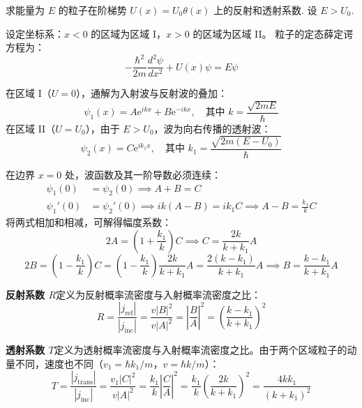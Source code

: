 \begin{exercise}\label{ex:24.5}
求能量为 $E$ 的粒子在阶梯势 $U(x) = U_0\theta(x)$ 上的反射和透射系数. 设 $E > U_0$.
\end{exercise}
\begin{solution}
设定坐标系：$x < 0$ 的区域为区域 I，$x > 0$ 的区域为区域 II。
粒子的定态薛定谔方程为：
$$ - \frac{\hbar^2}{2m} \frac{d^2\psi}{dx^2} + U(x)\psi = E\psi $$

在区域 I（$U = 0$），通解为入射波与反射波的叠加：
$$ \psi_1(x) = A \mathrm{e}^{ikx} + B \mathrm{e}^{-ikx}, \quad \text{其中 } k = \frac{\sqrt{2mE}}{\hbar} $$
在区域 II（$U = U_0$），由于 $E > U_0$，波为向右传播的透射波：
$$ \psi_2(x) = C \mathrm{e}^{ik_1 x}, \quad \text{其中 } k_1 = \frac{\sqrt{2m(E-U_0)}}{\hbar} $$

在边界 $x = 0$ 处，波函数及其一阶导数必须连续：
\begin{align*}
    \psi_1(0) &= \psi_2(0) \implies A + B = C \\
    \psi_1'(0) &= \psi_2'(0) \implies ik(A - B) = ik_1 C \implies A - B = \frac{k_1}{k} C
\end{align*}
将两式相加和相减，可解得幅度系数：
$$ 2A = \left(1 + \frac{k_1}{k}\right) C \implies C = \frac{2k}{k + k_1} A $$
$$ 2B = \left(1 - \frac{k_1}{k}\right) C = \left(1 - \frac{k_1}{k}\right) \frac{2k}{k + k_1} A = \frac{2(k - k_1)}{k + k_1} A \implies B = \frac{k - k_1}{k + k_1} A $$

\textbf{反射系数 $R$}定义为反射概率流密度与入射概率流密度之比：
$$ R = \frac{|j_{\text{ref}}|}{|j_{\text{inc}}|} = \frac{v |B|^2}{v |A|^2} = \left| \frac{B}{A} \right|^2 = \left( \frac{k - k_1}{k + k_1} \right)^2 $$

\textbf{透射系数 $T$}定义为透射概率流密度与入射概率流密度之比。由于两个区域粒子的动量不同，速度也不同（$v_1 = \hbar k_1 / m$，$v = \hbar k / m$）：
$$ T = \frac{|j_{\text{trans}}|}{|j_{\text{inc}}|} = \frac{v_1 |C|^2}{v |A|^2} = \frac{k_1}{k} \left| \frac{C}{A} \right|^2 = \frac{k_1}{k} \left( \frac{2k}{k + k_1} \right)^2 = \frac{4k k_1}{(k + k_1)^2} $$
\end{solution}

